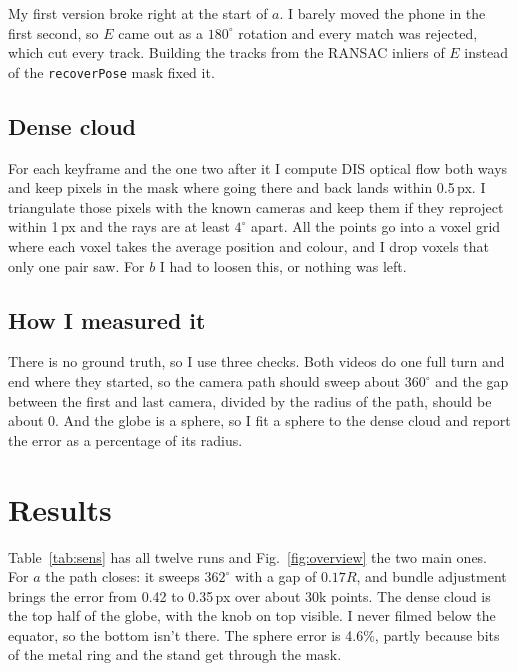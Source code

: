 \documentclass[conference]{assets/latex/IEEEtran}
\begin{document}
My first version broke right at the start of $a$. I barely moved the phone in
the first second, so $E$ came out as a $180^\circ$ rotation and every match
was rejected, which cut every track. Building the tracks from the RANSAC
inliers of $E$ instead of the \texttt{recoverPose} mask fixed it.

\subsection{Dense cloud}
For each keyframe and the one two after it I compute DIS optical flow both
ways and keep pixels in the mask where going there and back lands within
0.5\,px. I triangulate those pixels with the known cameras and keep them if
they reproject within 1\,px and the rays are at least $4^\circ$ apart. All the
points go into a voxel grid where each voxel takes the average position and
colour, and I drop voxels that only one pair saw. For $b$ I had to loosen
this, or nothing was left.

\subsection{How I measured it}
There is no ground truth, so I use three checks. Both videos do one full
turn and end where they started, so the camera path should sweep about
$360^\circ$ and the gap between the first and last camera, divided by the
radius of the path, should be about 0. And the globe is a sphere, so I fit a
sphere to the dense cloud and report the error as a percentage of its
radius.

\section{Results}
Table~\ref{tab:sens} has all twelve runs and Fig.~\ref{fig:overview} the two
main ones. For $a$ the path closes: it sweeps $362^\circ$ with a gap of
$0.17R$, and bundle adjustment brings the error from 0.42 to 0.35\,px over
about 30k points. The dense cloud is the top half of the globe, with the knob
on top visible. I never filmed below the equator, so the bottom isn't there.
The sphere error is 4.6\%, partly because bits of the metal ring and the
stand get through the mask.

\begin{table}[t]
\caption{All runs. kf: keyframes used/selected; 2-view: two-view
reprojection error; BA: error before $\to$ after global bundle adjustment;
swept: angle of the camera path (should be $360^\circ$); gap: start--end
gap over path radius (should be 0); sphere: sphere-fit error.}
\label{tab:sens}
\centering\scriptsize\setlength{\tabcolsep}{3pt}

\end{table}
\end{document}
